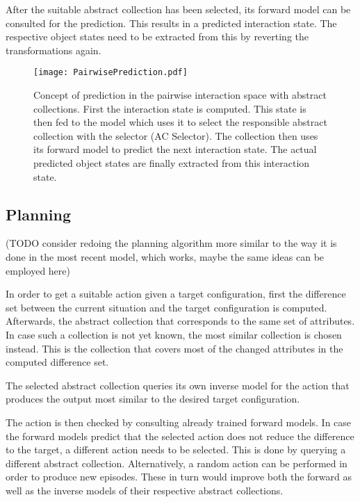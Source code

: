 After the suitable abstract collection has been selected, its forward model can be consulted for the prediction. This results in a predicted interaction state. The respective object states need to be extracted from this by reverting the transformations again.

\begin{figure}
	\centering
	\texttt{[image: PairwisePrediction.pdf]}
	\caption{Concept of prediction in the pairwise interaction space with abstract collections. First the interaction state is computed. This state is then fed to the model which uses it to select the responsible abstract collection with the selector (AC Selector). The collection then uses its forward model to predict the next interaction state. The actual predicted object states are finally extracted from this interaction state.} 
	\label{fig:PairPrediction}
\end{figure}

\subsection{Planning}

(TODO consider redoing the planning algorithm more similar to the way it is done
in the most recent model, which works, maybe the same ideas can be employed 
here)

In order to get a suitable action given a target configuration, first the 
difference set between the current situation and the target 
configuration is computed. Afterwards, the abstract collection that corresponds to the same set of attributes. In case such a collection is not yet known, the 
most similar collection is chosen instead. This is the collection that covers 
most of the changed attributes in the computed difference set. 

The selected abstract collection queries its own inverse model for the 
action that produces the output most similar to the desired target configuration. 

The action is then checked by consulting already trained forward models. In case the forward models predict that the selected action does not reduce the difference to the target, a different action needs to be selected. This is done by querying a different abstract collection. Alternatively, a random action can be performed in order to produce new episodes. These in turn would improve both the forward as well as the inverse models of their respective abstract collections.

